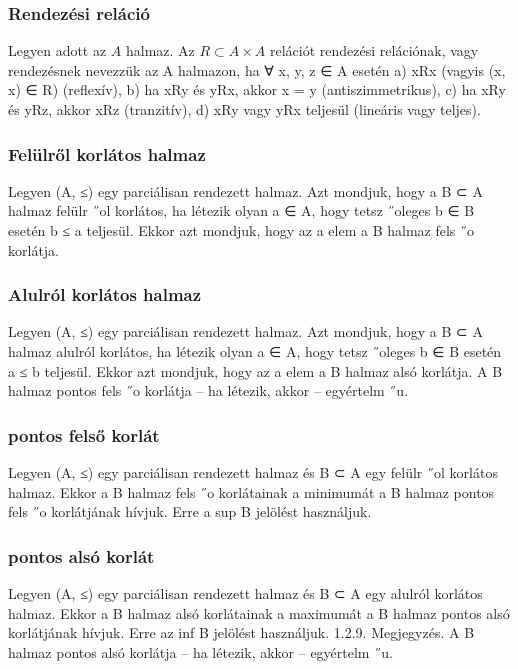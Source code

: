 \documentclass[12pt]{article}
\begin{document}
\subsubsection{Rendezési reláció}

Legyen adott az $A$ halmaz. Az $R \subset A\times A$ relációt rendezési
relációnak, vagy rendezésnek nevezzük az A halmazon, ha ∀ x, y, z ∈ A
esetén
a) xRx (vagyis (x, x) ∈ R) (reflexív),
b) ha xRy és yRx, akkor x = y (antiszimmetrikus),
c) ha xRy és yRz, akkor xRz (tranzitív),
d) xRy vagy yRx teljesül (lineáris vagy teljes).

\subsubsection{Felülről korlátos halmaz}

Legyen (A, ≤) egy parciálisan rendezett halmaz. Azt mondjuk, hogy a B ⊂ A halmaz
felülr ˝ol korlátos, ha létezik olyan a ∈ A, hogy tetsz ˝oleges b ∈ B esetén b ≤ a teljesül. Ekkor azt mondjuk,
hogy az a elem a B halmaz fels ˝o korlátja.

\subsubsection{Alulról korlátos halmaz}

Legyen (A, ≤) egy parciálisan rendezett halmaz. Azt mondjuk, hogy a B ⊂ A halmaz
alulról korlátos, ha létezik olyan a ∈ A, hogy tetsz ˝oleges b ∈ B esetén a ≤ b teljesül. Ekkor azt mondjuk,
hogy az a elem a B halmaz alsó korlátja.
A B halmaz pontos fels ˝o korlátja – ha létezik, akkor – egyértelm ˝u.

\subsubsection{pontos felső korlát}

Legyen (A, ≤) egy parciálisan rendezett halmaz és B ⊂ A egy felülr ˝ol korlátos halmaz.
Ekkor a B halmaz fels ˝o korlátainak a minimumát a B halmaz pontos fels ˝o korlátjának hívjuk. Erre a
sup B jelölést használjuk.

\subsubsection{pontos alsó korlát}

Legyen (A, ≤) egy parciálisan rendezett halmaz és B ⊂ A egy alulról korlátos halmaz.
Ekkor a B halmaz alsó korlátainak a maximumát a B halmaz pontos alsó korlátjának hívjuk. Erre az
inf B jelölést használjuk.
1.2.9. Megjegyzés. A B halmaz pontos alsó korlátja – ha létezik, akkor – egyértelm ˝u.
\end{document}
